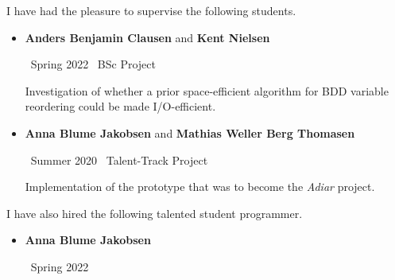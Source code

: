 
I have had the pleasure to supervise the following students.

\medskip

\begin{itemize}
\item {\color{accent} \textbf{Anders Benjamin Clausen} and \textbf{Kent Nielsen}}

  \smallskip

  \faCalendar\ Spring 2022 \hspace{90pt} \faGraduationCap\ BSc Project

  \medskip

  Investigation of whether a prior space-efficient algorithm for BDD variable
  reordering could be made I/O-efficient.

  \medskip

\item {\color{accent} \textbf{Anna Blume Jakobsen} and \textbf{Mathias Weller Berg Thomasen}}

  \smallskip

  \faCalendar\ Summer 2020 \hspace{82pt} \faGraduationCap\ Talent-Track Project

  \medskip

  Implementation of the prototype that was to become the \emph{Adiar} project.
\end{itemize}

\smallskip

I have also hired the following talented student programmer.

\medskip

\begin{itemize}
\item {\color{accent} \textbf{Anna Blume Jakobsen}}

  \smallskip

  \faCalendar \ Spring 2022
\end{itemize}
